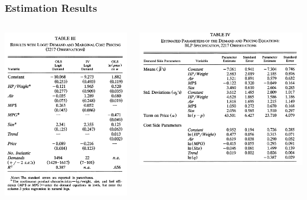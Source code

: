 \documentclass{beamer}
\begin{document}
\begin{frame}\frametitle{Estimation Results}
    \begin{columns}
        \begin{column}{0.4\textwidth}
            \includegraphics[width=\textwidth]{logit_results.png}
        \end{column}
        \begin{column}{0.6\textwidth}
            \includegraphics[width=\textwidth]{mixed_logit_results.png}
        \end{column}
    \end{columns}
\end{frame}
\end{document}
